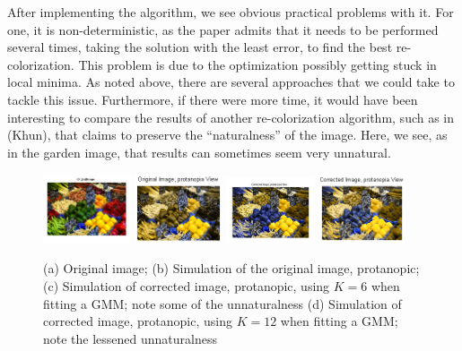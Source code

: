\documentclass[10pt,twocolumn,letterpaper]{article}
\begin{document}
	After implementing the algorithm, we see obvious practical problems with it. For one, it is non-deterministic, as the paper admits that it needs to be performed several times, taking the solution with the least error, to find the best re-colorization. This problem is due to the optimization possibly getting stuck in local minima. As noted above, there are several approaches that we could take to tackle this issue. Furthermore, if there were more time, it would have been interesting to compare the results of another re-colorization algorithm, such as in (Khun), that claims to preserve the “naturalness” of the image. Here, we see, as in the garden image, that results can sometimes seem very unnatural. 

\begin{figure}[h]
  \includegraphics[width=0.23\textwidth]{peppers2.png}
  \includegraphics[width=0.23\textwidth]{peppers_original_sim.png}
  \includegraphics[width=0.23\textwidth]{peppers.png}
  \includegraphics[width=0.23\textwidth]{peppers_12.png}
  \caption{(a) Original image; (b) Simulation of the original image, protanopic; (c) Simulation of corrected image, protanopic, using $K=6$ when fitting a GMM; note some of the unnaturalness (d) Simulation of corrected image, protanopic, using $K=12$ when fitting a GMM; note the lessened unnaturalness}
  \label{fig:peppers}
\end{figure}
\end{document}
